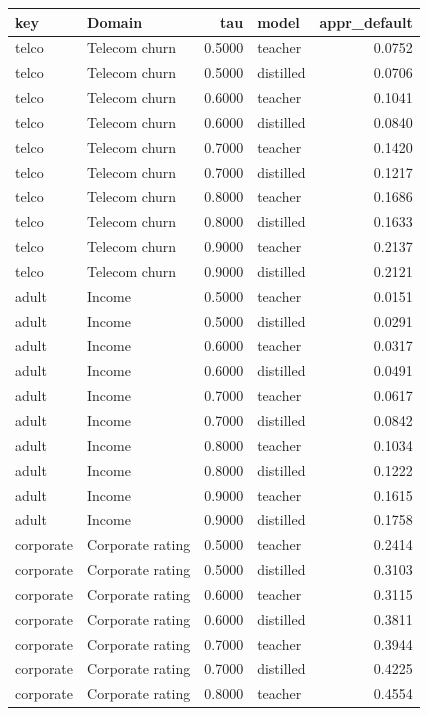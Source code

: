 \begin{tabular}{llrlr}
\toprule
key & Domain & tau & model & appr\_default \\
\midrule
telco & Telecom churn & 0.5000 & teacher & 0.0752 \\
telco & Telecom churn & 0.5000 & distilled & 0.0706 \\
telco & Telecom churn & 0.6000 & teacher & 0.1041 \\
telco & Telecom churn & 0.6000 & distilled & 0.0840 \\
telco & Telecom churn & 0.7000 & teacher & 0.1420 \\
telco & Telecom churn & 0.7000 & distilled & 0.1217 \\
telco & Telecom churn & 0.8000 & teacher & 0.1686 \\
telco & Telecom churn & 0.8000 & distilled & 0.1633 \\
telco & Telecom churn & 0.9000 & teacher & 0.2137 \\
telco & Telecom churn & 0.9000 & distilled & 0.2121 \\
adult & Income & 0.5000 & teacher & 0.0151 \\
adult & Income & 0.5000 & distilled & 0.0291 \\
adult & Income & 0.6000 & teacher & 0.0317 \\
adult & Income & 0.6000 & distilled & 0.0491 \\
adult & Income & 0.7000 & teacher & 0.0617 \\
adult & Income & 0.7000 & distilled & 0.0842 \\
adult & Income & 0.8000 & teacher & 0.1034 \\
adult & Income & 0.8000 & distilled & 0.1222 \\
adult & Income & 0.9000 & teacher & 0.1615 \\
adult & Income & 0.9000 & distilled & 0.1758 \\
corporate & Corporate rating & 0.5000 & teacher & 0.2414 \\
corporate & Corporate rating & 0.5000 & distilled & 0.3103 \\
corporate & Corporate rating & 0.6000 & teacher & 0.3115 \\
corporate & Corporate rating & 0.6000 & distilled & 0.3811 \\
corporate & Corporate rating & 0.7000 & teacher & 0.3944 \\
corporate & Corporate rating & 0.7000 & distilled & 0.4225 \\
corporate & Corporate rating & 0.8000 & teacher & 0.4554 \\

\end{tabular}
